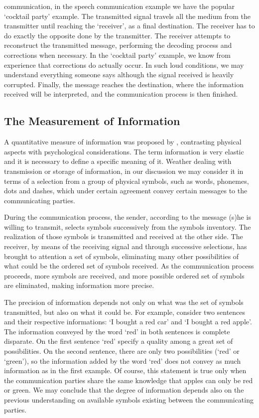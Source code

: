 communication, in the speech communication example we have the popular `cocktail party' example. 
The transmitted signal travels all the medium from the transmitter until reaching the `receiver', as a final destination. 
The receiver has to do exactly the opposite done by the transmitter. The receiver attempts to reconstruct the transmitted
message, performing the decoding process and corrections when necessary. In the `cocktail party' example, we know from 
experience that corrections do actually occur. In such loud conditions, we may understand everything someone says although 
the signal received is heavily corrupted. Finally, the message reaches the destination, where the information received will 
be interpreted, and the communication process is then finished.


\subsection{The Measurement of Information}
A quantitative measure of information was proposed by \citep{hartley1928}, contrasting physical aspects with 
psychological considerations. The term information is very elastic and it is necessary to define a specific 
meaning of it. Weather dealing with transmission or storage of information, in our discussion we may consider 
it in terms of a selection from a group of physical symbols, such as words, phonemes, dots and dashes, 
which under certain agreement convey certain messages to the communicating parties.

During the communication process, the sender, according to the message (s)he is willing to transmit, 
selects symbols successively from the symbols inventory. The realization of those symbols is transmitted and 
received at the other side. The receiver, by means of the receiving signal and through successive selections, 
has brought to attention a set of symbols, eliminating many other possibilities of what could be the ordered 
set of symbols received. As the communication process proceeds, more symbols are received, and more possible 
ordered set of symbols are eliminated, making information more precise.

The precision of information depends not only on what was the set of symbols transmitted, 
but also on what it could be. For example, consider two sentences and their respective informations: 
`I bought a red car' and `I bought a red apple'. The information conveyed by the word `red' in both sentences 
is complete disparate. On the first sentence `red' specify a quality among a great set of possibilities. 
On the second sentence, there are only two possibilities (`red' or `green'), so the information added 
by the word `red' does not convey as much information as in the first example. 
Of course, this statement is true only when the communication parties share the same knowledge that 
apples can only be red or green. We may conclude that the degree of information depends also on the 
previous understanding on available symbols existing between the communicating parties.

